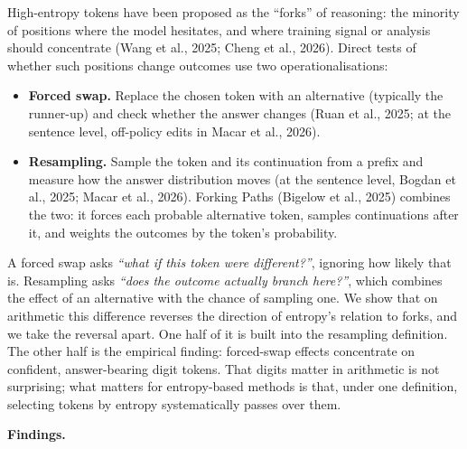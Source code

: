 \documentclass[
  10pt,
  a4paper,
]{article}
\providecommand{\tightlist}{%
  \setlength{\itemsep}{0pt}\setlength{\parskip}{0pt}}
\begin{document}
High-entropy tokens have been proposed as the ``forks'' of reasoning: the minority of positions where the model hesitates, and where training signal or analysis should concentrate (Wang et al., 2025;
Cheng et al., 2026). Direct tests of whether such positions change outcomes use two operationalisations:

\begin{itemize}
\tightlist
\item
  \textbf{Forced swap.} Replace the chosen token with an alternative (typically the runner-up) and check whether the answer changes (Ruan et al., 2025; at the sentence level, off-policy edits in Macar
  et al., 2026).
\item
  \textbf{Resampling.} Sample the token and its continuation from a prefix and measure how the answer distribution moves (at the sentence level, Bogdan et al., 2025; Macar et al., 2026). Forking Paths
  (Bigelow et al., 2025) combines the two: it forces each probable alternative token, samples continuations after it, and weights the outcomes by the token's probability.
\end{itemize}

A forced swap asks \emph{``what if this token were different?''}, ignoring how likely that is. Resampling asks \emph{``does the outcome actually branch here?''}, which combines the effect of an
alternative with the chance of sampling one. We show that on arithmetic this difference reverses the direction of entropy's relation to forks, and we take the reversal apart. One half of it is built
into the resampling definition. The other half is the empirical finding: forced-swap effects concentrate on confident, answer-bearing digit tokens. That digits matter in arithmetic is not surprising;
what matters for entropy-based methods is that, under one definition, selecting tokens by entropy systematically passes over them.

\textbf{Findings.}
\end{document}
